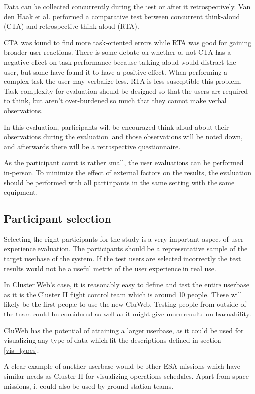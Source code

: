 Data can be collected concurrently during the test or after it retrospectively. Van den Haak et al. performed a comparative test between concurrent think-aloud (CTA) and retrospective think-aloud (RTA).

CTA was found to find more task-oriented errors while RTA was good for gaining broader user reactions. There is some debate on whether or not CTA has a negative effect on task performance because talking aloud would distract the user, but some have found it to have a positive effect. When performing a complex task the user may verbalize less. RTA is less susceptible this problem. Task complexity for evaluation should be designed so that the users are required to think, but aren't over-burdened so much that they cannot make verbal observations.
\cite{van2003retrospective}

In this evaluation, participants will be encouraged think aloud about their observations during the evaluation, and those observations will be noted down, and afterwards there will be a retrospective questionnaire.

As the participant count is rather small, the user evaluations can be performed in-person. To minimize the effect of external factors on the results, the evaluation should be performed with all participants in the same setting with the same equipment.

\subsection{Participant selection}
Selecting the right participants for the study is a very important aspect of user experience evaluation. The participants should be a representative sample of the target userbase of the system. If the test users are selected incorrectly the test results would not be a useful metric of the user experience in real use.

In Cluster Web's case, it is reasonably easy to  define and test the entire userbase as it is the Cluster II flight control team which is around 10 people. These will likely be the  first people to use the new CluWeb. Testing people from outside of the team could be considered as well as it might give more results on learnability.

CluWeb has the potential of attaining a larger userbase, as it could be used for visualizing any type of data which fit the descriptions defined in section \ref{vis_types}. 

A clear example of another userbase would be other ESA missions which have similar needs as Cluster II for visualizing operations schedules. Apart from space missions, it could also be used by ground station teams.

